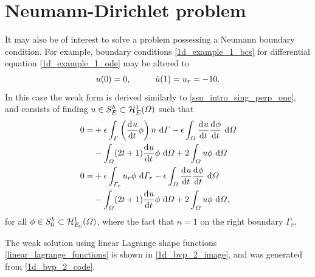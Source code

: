 
  \section{Neumann-Dirichlet problem}

  It may also be of interest to solve a problem possessing a Neumann boundary condition.  For example, boundary conditions \cref{1d_example_1_bcs} for differential equation \cref{1d_example_1_ode} may be altered to 
  \begin{align}
    \label{1d_example_2_bcs}
    u(0) = 0, \hspace{10mm} \dot{u}(1) = u_r = -10.
  \end{align}
  In this case the weak form is derived similarly to \cref{ssn_intro_sing_perp_one}, and consists of finding $u \in S_E^h \subset \mathcal{H}_E^1(\varOmega)$ such that
  \begin{align*}
    0 = &+\epsilon \int_{\varGamma} \left( \frac{\mathrm{d}{^{}} u}{\mathrm{d} t{^{}} } \phi \right) n \ \mathrm{d}\varGamma - \epsilon \int_{\varOmega} \frac{\mathrm{d}{^{}} u}{\mathrm{d} t{^{}} } \frac{\mathrm{d}{^{}} \phi}{\mathrm{d} t{^{}} } \ \mathrm{d}\varOmega \\
    &- \int_{\varOmega} (2t + 1) \frac{\mathrm{d}{^{}} u}{\mathrm{d} t{^{}} } \phi \ \mathrm{d}\varOmega + 2\int_{\varOmega} u \phi \ \mathrm{d}\varOmega \\
    0 = &+\epsilon \int_{\varGamma_r} u_r \phi \ \mathrm{d}\varGamma_r - \epsilon \int_{\varOmega} \frac{\mathrm{d}{^{}} u}{\mathrm{d} t{^{}} } \frac{\mathrm{d}{^{}} \phi}{\mathrm{d} t{^{}} } \ \mathrm{d}\varOmega \\
    &- \int_{\varOmega} (2t + 1) \frac{\mathrm{d}{^{}} u}{\mathrm{d} t{^{}} } \phi \ \mathrm{d}\varOmega + 2\int_{\varOmega} u \phi \ \mathrm{d}\varOmega,
  \end{align*}
  for all $\phi \in S_0^h \subset \mathcal{H}_{E_0}^1(\varOmega)$, where the fact that $n = 1$ on the right boundary $\Gamma_r$.
    
    The weak solution using linear Lagrange shape functions \cref{linear_lagrange_functions} is shown in \cref{1d_bvp_2_image}, and was generated from \cref{1d_bvp_2_code}.


